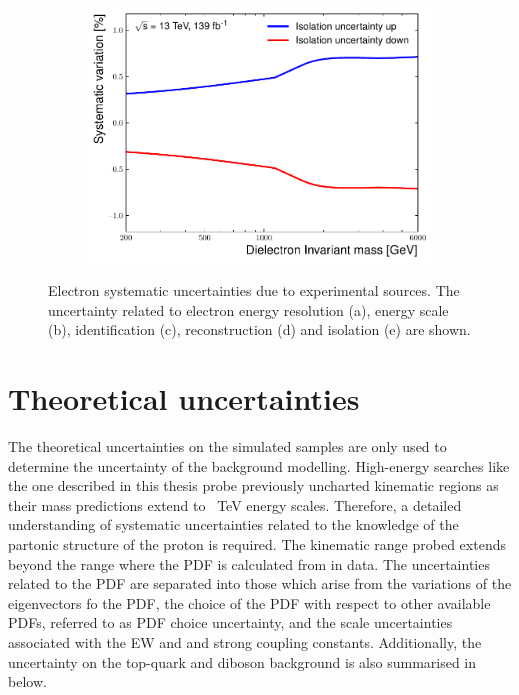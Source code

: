 \begin{figure}[]
\begin{subfigure}[b]{0.42\textwidth}
        \includegraphics[width=\textwidth]{figures/analysis/datamc/Uncertainties/exp/ee/m_ee_pstOR_EL_EFF_Iso_TOTAL_1NPCOR_PLUS_UNCOR__1up.pdf}
        \caption{}
        \label{fig:uncert:eeIso}
    \end{subfigure}
    \caption[Electron systematic uncertainties due to experimental sources]{Electron systematic uncertainties due to experimental sources. The uncertainty related to electron energy resolution (a), energy scale (b), identification (c), reconstruction (d) and isolation (e) are shown.}
    \label{fig:uncert:eeExp}
\end{figure}

\section{Theoretical uncertainties}\label{sec:sysmc:theory}
The theoretical uncertainties on the simulated samples are only used to determine the uncertainty of the background modelling. High-energy searches like the one described in this thesis probe previously uncharted kinematic regions as their mass predictions extend to \SI{}{\tera\electronvolt} energy scales. Therefore, a detailed understanding of systematic uncertainties related to the knowledge of the partonic structure of the proton is required. The kinematic range probed extends beyond the range where the PDF is calculated from in data. The uncertainties related to the PDF are separated into those which arise from the variations of the eigenvectors fo the PDF, the choice of the PDF with respect to other available PDFs, referred to as PDF choice uncertainty, and the scale uncertainties associated with the EW and and strong coupling constants. Additionally, the uncertainty on the top-quark and diboson background is also summarised in below. 

